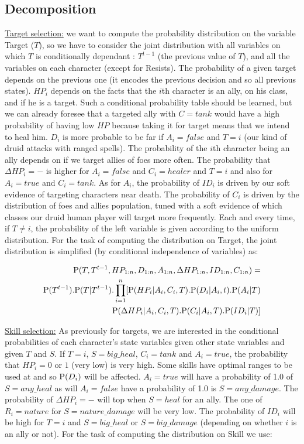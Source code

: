 \subsection{Decomposition}

\underline{Target selection:} we want to compute the probability distribution on the variable Target ($T$), so we have to consider the joint distribution with all variables on which $T$ is conditionally dependant : $T^{t-1}$ (the previous value of $T$), and all the variables on each character (except for Resists). The probability of a given target depends on the previous one (it encodes the previous decision and so all previous states). $HP_i$ depends on the facts that the $i$th character is an ally, on his class, and if he is a target. Such a conditional probability table should be learned, but we can already foresee that a targeted ally with $C=tank$ would have a high probability of having low $HP$ because taking it for target means that we intend to heal him. $D_i$ is more probable to be far if $A_i=false$ and $T=i$ (our kind of druid attacks with ranged spells). The probability of the $i$th character being an ally depends on if we target allies of foes more often. The probability that $\Delta HP_i=-$ is higher for $A_i=false$ and $C_i=healer$ and $T=i$ and also for $A_i=true$ and $C_i=tank$. As for $A_i$, the probability of $ID_i$ is driven by our soft evidence of targeting characters near death. The probability of $C_i$ is driven by the distribution of foes and allies population, tuned with a soft evidence of which classes our druid human player will target more frequently. Each and every time, if $T \neq i$, the probability of the left variable is given according to the uniform distribution. For the task of computing the distribution on Target, the joint distribution is simplified (by conditional independence of variables) as:

\begin{eqnarray*}
\mathrm{P}(T, T^{t-1}, HP_{1:n}, D_{1:n}, A_{1:n}, \Delta HP_{1:n}, ID_{1:n}, C_{1:n}) = \\
\mathrm{P}(T^{t-1}).\mathrm{P}(T|T^{t-1}).\prod_{i=1}^n [ \mathrm{P}(HP_i | A_i, C_i, T).\mathrm{P}(D_i | A_i, t).\mathrm{P}(A_i | T)\\
\mathrm{P}(\Delta HP_i | A_i, C_i, T).\mathrm{P}(C_i | A_i, T).\mathrm{P}(ID_i | T) ]
\end{eqnarray*}

\underline{Skill selection:} As previously for targets, we are interested in the conditional probabilities of each character's state variables given other state variables and given $T$ and $S$. If $T=i$, $S=big\_heal$, $C_i=tank$ and $A_i=true$, the probability that $HP_i=0$ or $1$ (very low) is very high. Some skills have optimal ranges to be used at and so $\mathrm{P}(D_i)$ will be affected. $A_i=true$ will have a probability of 1.0 of $S=any\_heal$ as will $A_i=false$ have a probability of 1.0 is $S=any\_damage$. The probability of $\Delta HP_i=-$ will top when $S=heal$ for an ally. The one of $R_i=nature$ for $S=nature\_damage$ will be very low. The probability of $ID_i$ will be high for $T=i$ and $S=big\_heal$ or $S=big\_damage$ (depending on whether $i$ is an ally or not). For the task of computing the distribution on Skill we use:

